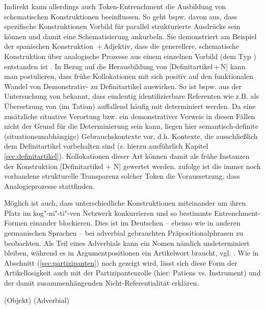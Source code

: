 Indirekt kann allerdings auch Token-Entrenchment die Ausbildung von schematischen Konstruktionen beeinflussen. So geht bspw. \textcite[96]{Bybee2010} davon aus, dass spezifische Konstruktionen Vorbild für parallel strukturierte Ausdrücke sein können und damit eine Schematisierung ankurbeln. Sie demonstriert am Beispiel der spanischen Konstruktion \,+\,Adjektiv, dass die generellere, schematische  Konstruktion über analogische Prozesse aus einem einzelnen Vorbild (dem Typ ) entstanden ist \parencite[72]{Bybee2010}. In Bezug auf die Herausbildung von [Definitartikel\,+\,N] kann man postulieren, dass frühe Kollokationen mit  sich positiv auf den funktionalen Wandel von Demonstrativ- zu Definitartikel auswirken. So ist bspw. aus der Untersuchung von \textcite{Oubouzar1992} bekannt, dass eindeutig identifizierbare Referenten wie  z.B.  als Übersetzung von  (im Tatian) auffallend häufig mit  determiniert werden. Da eine zusätzliche situative Verortung bzw. ein demonstrativer Verweis in diesen Fällen nicht der Grund für die Determinierung sein kann, liegen hier semantisch-definite (situationsunabhängige) Gebrauchskontexte vor, d.h. Kontexte, die ausschließlich dem Definitartikel vorbehalten sind (s. hierzu ausführlich Kapitel \ref{sec:definitartikel}). Kollokationen dieser Art können damit als frühe Instanzen der Konstruktion [Definitartikel + N] gewertet werden. \textcite[96]{Bybee2010} zufolge ist die immer noch vorhandene strukturelle Transparenz solcher Token die Voraussetzung, dass Analogieprozesse stattfinden.   

Möglich ist auch, dass unterschiedliche Konstruktionen miteinander um ihren Platz im kog"-ni"-ti"-ven Netzwerk konkurrieren und so bestimmte Entrenchment-Formen einander blockieren. Dies ist im Deutschen -- ebenso wie in anderen germanischen Sprachen \parencite[s.][]{Himmelmann1998} -- bei adverbial gebrauchten Präpositionalphrasen zu beobachten. Als Teil eines Adverbials kann ein Nomen nämlich undeterminiert bleiben, während es in Argumentpositionen ein Artikelwort braucht, vgl. . Wie in Abschnitt (\ref{sec:partizipanten}) noch gezeigt wird, lässt sich diese Form der Artikellosigkeit auch mit der Partizipantenrolle (hier: Patiens vs. Instrument) und der damit zusammenhängenden Nicht-Referentialität erklären.  

\begin{exe}
	\ex \label{ex:fuss}
	\begin{xlist}
		\ex \label{ex:denfuss}  (Objekt)
		\ex \label{ex:zufuss}  (Adverbial)
	\end{xlist}
\end{exe}


